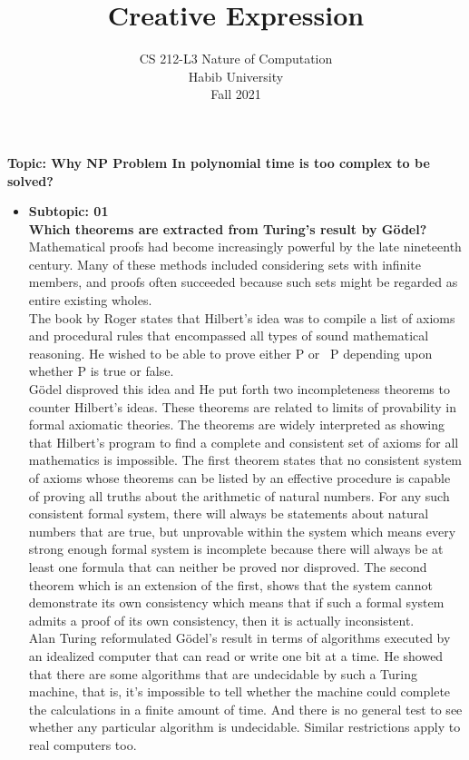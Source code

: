 \documentclass[a4page]{exam}
\title{Creative Expression}
\author{CS 212-L3 Nature of Computation\\Habib University\\Fall 2021}
\newcommand\tab[1][1cm]{\hspace*{#1}}
\begin{document}
\maketitle
\thispagestyle{empty}
\begin{center}
    \textbf{Topic: Why NP Problem In polynomial time is too complex to be solved?}
\end{center}
\begin{itemize}
    \item \textbf{Subtopic: 01\\ Which theorems are extracted from Turing’s result by Gödel?\\}
    \tab Mathematical proofs had become increasingly powerful by the late nineteenth century. Many of these methods included considering sets with infinite members, and proofs often succeeded because such sets might be regarded as entire existing wholes.\\
\tab The book by Roger states that Hilbert’s idea was to compile a list of axioms and procedural rules that encompassed all types of sound mathematical reasoning. He wished to be able to prove either P or ~P depending upon whether P is true or false. \\
\tab
Gödel disproved this idea and He put forth two incompleteness theorems to counter Hilbert’s ideas. These theorems are related to limits of provability in formal axiomatic theories. 
The theorems are widely interpreted as showing that Hilbert's program to find a complete and consistent set of axioms for all mathematics is impossible. The first theorem states that no consistent system of axioms whose theorems can be listed by an effective procedure is capable of proving all truths about the arithmetic of natural numbers. For any such consistent formal system, there will always be statements about 
natural numbers that are true, but unprovable within the system which means every strong enough formal system is incomplete because there will always be at least one formula that can neither be proved nor disproved. The second theorem which is an extension of the first, shows that the system cannot demonstrate its own consistency which means that if such a formal system admits a proof of its own consistency, then it is actually inconsistent.\\
\tab
Alan Turing reformulated Gödel’s result in terms of algorithms executed by an idealized computer that can read or write one bit at a time. He showed that there are some algorithms that are undecidable by such a Turing machine, that is, it’s impossible to tell whether the machine could complete the calculations in a finite amount of time. And there is no general test to see whether any particular algorithm is undecidable. Similar restrictions apply to real computers too.\\

\end{itemize}
\end{document}
